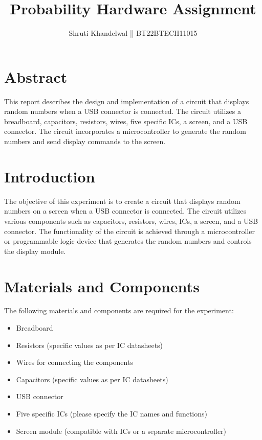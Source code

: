 \documentclass{article}
\begin{document}
\title{Probability Hardware Assignment}
\author{Shruti Khandelwal || BT22BTECH11015}
\maketitle

\section{Abstract}
This report describes the design and implementation of a circuit that displays random numbers when a USB connector is connected. The circuit utilizes a breadboard, capacitors, resistors, wires, five specific ICs, a screen, and a USB connector. The circuit incorporates a microcontroller to generate the random numbers and send display commands to the screen.

\section{Introduction}
The objective of this experiment is to create a circuit that displays random numbers on a screen when a USB connector is connected. The circuit utilizes various components such as capacitors, resistors, wires, ICs, a screen, and a USB connector. The functionality of the circuit is achieved through a microcontroller or programmable logic device that generates the random numbers and controls the display module.

\section{Materials and Components}
The following materials and components are required for the experiment:
\begin{itemize}
  \item Breadboard
  \item Resistors (specific values as per IC datasheets)
  \item Wires for connecting the components
  \item Capacitors (specific values as per IC datasheets)
  \item USB connector
  \item Five specific ICs (please specify the IC names and functions)
  \item Screen module (compatible with ICs or a separate microcontroller)
\end{itemize}
\end{document}
